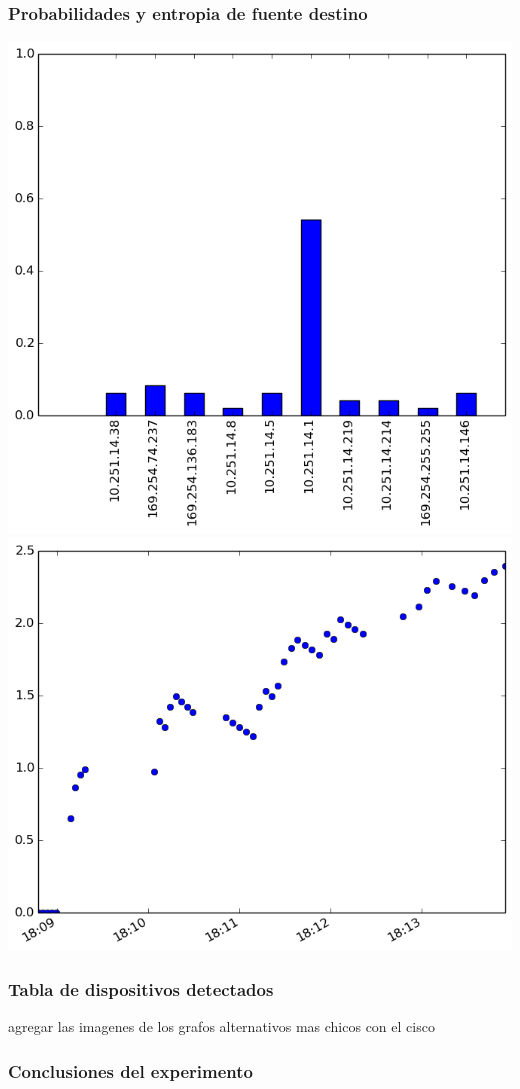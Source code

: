 \subsubsection{Probabilidades y entropia de fuente destino}
\includegraphics[scale=0.33]{../experimentacion-svilerino/starbucks/full-experiment-1/histogram_dst_probabilities.png}
\includegraphics[scale=0.33]{../experimentacion-svilerino/starbucks/full-experiment-1/entropy_dst.png}

\subsubsection{Tabla de dispositivos detectados}


\huge{agregar las imagenes de los grafos alternativos mas chicos con el cisco}

\subsubsection{Conclusiones del experimento}